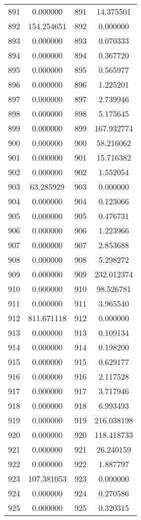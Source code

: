 \documentclass[12pt]{article}
\begin{document}
\begin{longtable}{@{}cccc@{}}
891 & 0.000000 & 891 & 14.375501 \\
892 & 154.254651 & 892 & 0.000000 \\
893 & 0.000000 & 893 & 0.070333 \\
894 & 0.000000 & 894 & 0.367720 \\
895 & 0.000000 & 895 & 0.565977 \\
896 & 0.000000 & 896 & 1.225201 \\
897 & 0.000000 & 897 & 2.739946 \\
898 & 0.000000 & 898 & 5.175645 \\
899 & 0.000000 & 899 & 167.932774 \\
900 & 0.000000 & 900 & 58.216062 \\
901 & 0.000000 & 901 & 15.716382 \\
902 & 0.000000 & 902 & 1.552054 \\
903 & 63.285929 & 903 & 0.000000 \\
904 & 0.000000 & 904 & 0.123066 \\
905 & 0.000000 & 905 & 0.476731 \\
906 & 0.000000 & 906 & 1.223966 \\
907 & 0.000000 & 907 & 2.853688 \\
908 & 0.000000 & 908 & 5.298272 \\
909 & 0.000000 & 909 & 232.012374 \\
910 & 0.000000 & 910 & 98.526781 \\
911 & 0.000000 & 911 & 3.965540 \\
912 & 811.671118 & 912 & 0.000000 \\
913 & 0.000000 & 913 & 0.109134 \\
914 & 0.000000 & 914 & 0.198200 \\
915 & 0.000000 & 915 & 0.629177 \\
916 & 0.000000 & 916 & 2.117528 \\
917 & 0.000000 & 917 & 3.717946 \\
918 & 0.000000 & 918 & 6.993493 \\
919 & 0.000000 & 919 & 216.038198 \\
920 & 0.000000 & 920 & 118.418733 \\
921 & 0.000000 & 921 & 26.240159 \\
922 & 0.000000 & 922 & 1.887797 \\
923 & 107.381053 & 923 & 0.000000 \\
924 & 0.000000 & 924 & 0.270586 \\
925 & 0.000000 & 925 & 0.320315 \\

\end{longtable}
\end{document}
